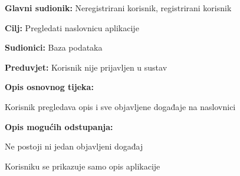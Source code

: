				\noindent {}
				\begin{packed_item}
					
					\item \textbf{Glavni sudionik:} Neregistrirani korisnik, registrirani korisnik
					\item  \textbf{Cilj:} Pregledati naslovnicu aplikacije
					\item  \textbf{Sudionici:} Baza podataka
					\item  \textbf{Preduvjet:} Korisnik nije prijavljen u sustav
					\item  \textbf{Opis osnovnog tijeka:}
					
					\item[] \begin{packed_enum}
						
						\item Korisnik pregledava opis i sve objavljene događaje na naslovnici
						
					\end{packed_enum}
					
					\item  \textbf{Opis mogućih odstupanja:}
					
					\item[] \begin{packed_item}
						
						\item[1.a] Ne postoji ni jedan objavljeni događaj
						\item[] \begin{packed_enum}
							
							\item Korisniku se prikazuje samo opis aplikacije
							
						\end{packed_enum}
					\end{packed_item}
				\end{packed_item}
				
